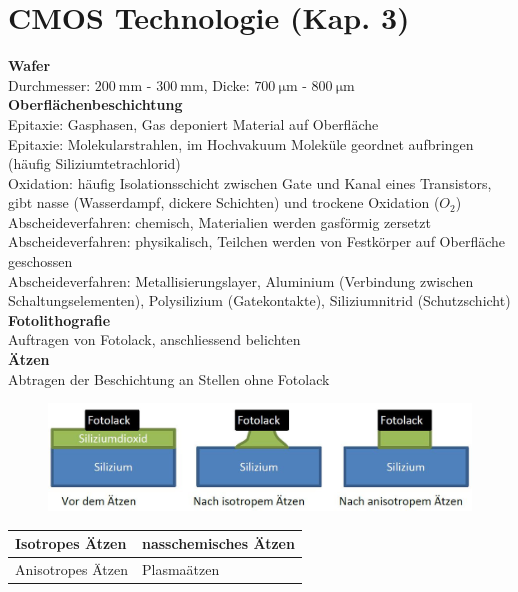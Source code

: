 
\section{CMOS Technologie (Kap. 3)}

\begin{minipage}[t]{0.5\textwidth}
	\textbf{Wafer}\\
	Durchmesser: $\SI{200}{\milli \meter}$ - $\SI{300}{\milli \meter}$, Dicke: $\SI{700}{\micro \meter}$ - $\SI{800}{\micro \meter}$ \\
	\textbf{Oberflächenbeschichtung}\\
	Epitaxie: Gasphasen, Gas deponiert Material auf Oberfläche\\ 
	Epitaxie: Molekularstrahlen, im Hochvakuum Moleküle geordnet aufbringen (häufig Siliziumtetrachlorid) \\
	Oxidation: häufig Isolationsschicht zwischen Gate und Kanal eines Transistors, gibt nasse (Wasserdampf, dickere Schichten) und trockene Oxidation ($O_2$) \\
	Abscheideverfahren: chemisch, Materialien werden gasförmig zersetzt \\
	Abscheideverfahren: physikalisch, Teilchen werden von Festkörper auf Oberfläche geschossen\\
	Abscheideverfahren: Metallisierungslayer, Aluminium (Verbindung zwischen Schaltungselementen), Polysilizium (Gatekontakte), Siliziumnitrid (Schutzschicht) \\
	\textbf{Fotolithografie}\\
	Auftragen von Fotolack, anschliessend belichten\\ 
	\textbf{Ätzen}\\
	Abtragen der Beschichtung an Stellen ohne Fotolack
	\begin{figure}[H]
		\includegraphics[width=0.8\linewidth]{chapters/Technologie/images/Aetzen}
	\end{figure}
	\begin{tabular}{|l|l|}
		\hline
		Isotropes Ätzen&nasschemisches Ätzen\\ \hline
		Anisotropes Ätzen&Plasmaätzen\\ \hline
	\end{tabular}
\end{minipage}
